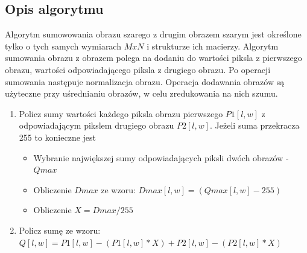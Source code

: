 \documentclass[a4paper,12pt, titlepage]{report}
\begin{document}
\subsection*{Opis algorytmu}
\par Algorytm sumowowania obrazu szarego z drugim obrazem szarym jest określone tylko o tych samych wymiarach \(MxN\) i strukturze ich macierzy. Algorytm sumowania obrazu z obrazem polega na dodaniu do wartości piksla z  pierwszego obrazu, wartości odpowiadającego piksla z drugiego obrazu. Po operacji sumowania następuje normalizacja obrazu. Operacja dodawania obrazów są użyteczne przy uśrednianiu obrazów, w celu zredukowania na nich szumu.
\begin{enumerate}
\item Policz sumy wartości każdego piksla obrazu pierwszego \(P1[l,w]\) z odpowiadającym pikslem drugiego obrazu \(P2[l,w]\). Jeżeli suma przekracza 255 to konieczne jest
\begin{itemize}
\item Wybranie największej sumy odpowiadających piksli dwóch obrazów - \(Q{max}\) 
\item Obliczenie \(D{max}\) ze wzoru: \(D{max}[l,w]=(Q{max}[l,w]-255)\)
\item Obliczenie \(X=D{max}/255\)
\end{itemize}
\item Policz sumę ze wzoru: \(Q[l,w]=P1[l,w]-(P1[l,w]*X)+P2[l,w]-(P2[l,w]*X)\)
\end{enumerate}
\end{document}

